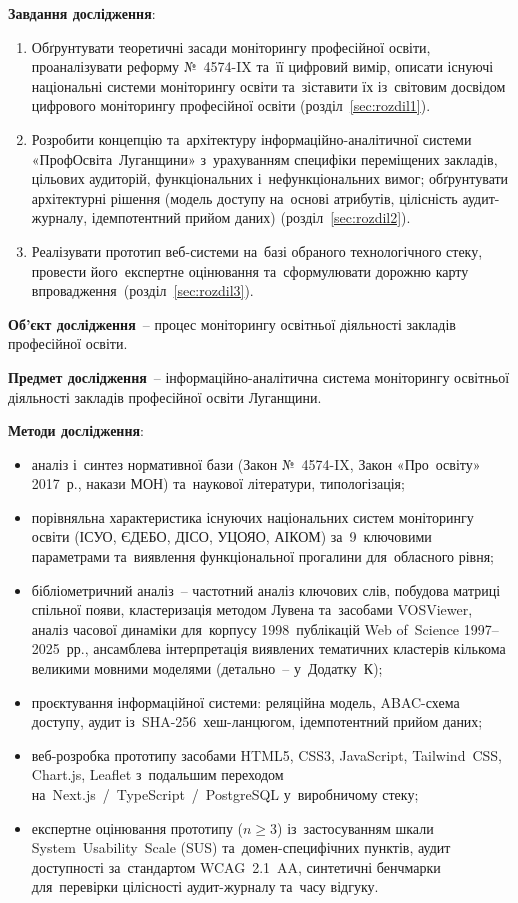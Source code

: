 \textbf{Завдання дослідження}:
\begin{enumerate}
    \item Обґрунтувати теоретичні засади моніторингу професійної освіти, проаналізувати реформу №~4574-IX та~її цифровий вимір, описати існуючі національні системи моніторингу освіти та~зіставити їх із~світовим досвідом цифрового моніторингу професійної освіти (розділ~\ref{sec:rozdil1}).
    \item Розробити концепцію та~архітектуру інформаційно-аналітичної системи «ПрофОсвіта~Луганщини» з~урахуванням специфіки переміщених закладів, цільових аудиторій, функціональних і~нефункціональних вимог; обґрунтувати архітектурні рішення (модель доступу на~основі атрибутів, цілісність аудит-журналу, ідемпотентний прийом даних) (розділ~\ref{sec:rozdil2}).
    \item Реалізувати прототип веб-системи на~базі обраного технологічного стеку, провести його~експертне оцінювання та~сформулювати дорожню карту впровадження~(розділ~\ref{sec:rozdil3}).
\end{enumerate}

\textbf{Об'єкт дослідження}~-- процес моніторингу освітньої діяльності закладів професійної освіти.

\textbf{Предмет дослідження}~-- інформаційно-аналітична система моніторингу освітньої діяльності закладів професійної освіти Луганщини.

\textbf{Методи дослідження}:
\begin{itemize}
    \item аналіз і~синтез нормативної бази (Закон №~4574-IX, Закон «Про~освіту» 2017~р., накази МОН) та~наукової літератури, типологізація;
    \item порівняльна характеристика існуючих національних систем моніторингу освіти (ІСУО, ЄДЕБО, ДІСО, УЦОЯО, АІКОМ) за~9~ключовими параметрами та~виявлення функціональної прогалини для~обласного рівня;
    \item бібліометричний аналіз~-- частотний аналіз ключових слів, побудова матриці спільної появи, кластеризація методом Лувена та~засобами VOSViewer, аналіз часової динаміки для~корпусу 1998~публікацій Web of~Science 1997--2025~рр., ансамблева інтерпретація виявлених тематичних кластерів кількома великими мовними моделями (детально~-- у~Додатку~К);
    \item проєктування інформаційної системи: реляційна модель, ABAC-схема доступу, аудит із~SHA-256~хеш-ланцюгом, ідемпотентний прийом даних;
    \item веб-розробка прототипу засобами HTML5, CSS3, JavaScript, Tailwind~CSS, Chart.js, Leaflet з~подальшим переходом на~Next.js~/~TypeScript~/~PostgreSQL у~виробничому стеку;
    \item експертне оцінювання прототипу ($n\geq 3$) із~застосуванням шкали System~Usability~Scale (SUS) та~домен-специфічних пунктів, аудит доступності за~стандартом WCAG~2.1~AA, синтетичні бенчмарки для~перевірки цілісності аудит-журналу та~часу відгуку.
\end{itemize}

